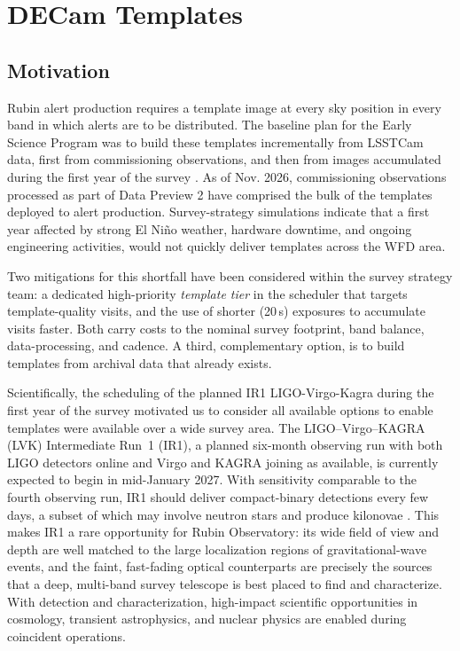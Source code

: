 \section{DECam Templates}\label{sec:inception}
 
\subsection{Motivation}
 
Rubin alert production requires a template image at every sky position in every band in which alerts are to be distributed. 
The baseline plan for the Early Science Program was to build these templates incrementally from LSSTCam data, first from commissioning observations, and then from images accumulated during the first year of the survey \citep{DMTN-107,RTN-011}. 
As of Nov. 2026, commissioning observations processed as part of Data Preview 2 have comprised the bulk of the templates deployed to alert production.
Survey-strategy simulations indicate that a first year affected by strong El Ni\~no weather, hardware downtime, and ongoing engineering activities, would not quickly deliver templates across the WFD area.

Two mitigations for this shortfall have been considered within the survey strategy team: a dedicated high-priority \textit{template tier} in the scheduler that targets template-quality visits, and the use of shorter (20\,s) exposures to accumulate visits faster. Both carry costs to the nominal survey footprint, band balance, data-processing, and cadence. A third, complementary option, is to build templates from archival data that already exists.


Scientifically, the scheduling of the planned IR1 LIGO-Virgo-Kagra during the first year of the survey motivated us to consider all available options to enable templates were available over a wide survey area.
The LIGO--Virgo--KAGRA (LVK) Intermediate Run~1 (IR1), a planned six-month observing run with both LIGO detectors online and Virgo and KAGRA joining as available, is currently expected to begin in mid-January 2027. With sensitivity comparable to the fourth observing run, IR1 should deliver compact-binary detections every few days, a subset of which may involve neutron stars and produce kilonovae \citep{igwn_observing_plans_2026}. This makes IR1 a rare opportunity for Rubin Observatory: its wide field of view and depth are well matched to the large localization regions of gravitational-wave events, and the faint, fast-fading optical counterparts are precisely the sources that a deep, multi-band survey telescope is best placed to find and characterize. With detection and characterization, high-impact scientific opportunities in cosmology, transient astrophysics, and nuclear physics are enabled during coincident operations.

